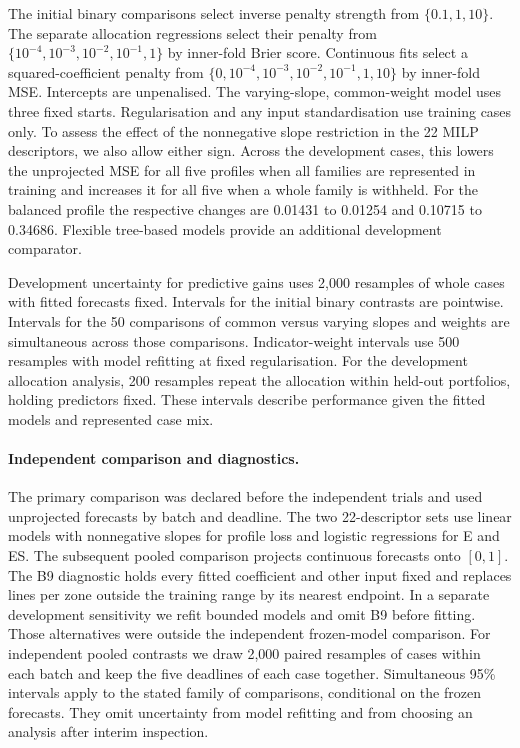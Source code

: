 \documentclass[11pt,a4paper]{article}
\begin{document}
The initial binary comparisons select inverse penalty strength from \(\{0.1,1,10\}\). The separate allocation regressions select their penalty from \(\{10^{-4},10^{-3},10^{-2},10^{-1},1\}\) by inner-fold Brier score. Continuous fits select a squared-coefficient penalty from \(\{0,10^{-4},10^{-3},10^{-2},10^{-1},1,10\}\) by inner-fold MSE. Intercepts are unpenalised. The varying-slope, common-weight model uses three fixed starts. Regularisation and any input standardisation use training cases only. To assess the effect of the nonnegative slope restriction in the 22 MILP descriptors, we also allow either sign. Across the development cases, this lowers the unprojected MSE for all five profiles when all families are represented in training and increases it for all five when a whole family is withheld. For the balanced profile the respective changes are 0.01431 to 0.01254 and 0.10715 to 0.34686. Flexible tree-based models provide an additional development comparator.

Development uncertainty for predictive gains uses 2,000 resamples of whole cases with fitted forecasts fixed. Intervals for the initial binary contrasts are pointwise. Intervals for the 50 comparisons of common versus varying slopes and weights are simultaneous across those comparisons. Indicator-weight intervals use 500 resamples with model refitting at fixed regularisation. For the development allocation analysis, 200 resamples repeat the allocation within held-out portfolios, holding predictors fixed. These intervals describe performance given the fitted models and represented case mix.

\paragraph{Independent comparison and diagnostics.}
The primary comparison was declared before the independent trials and used unprojected forecasts by batch and deadline. The two 22-descriptor sets use linear models with nonnegative slopes for profile loss and logistic regressions for E and ES. The subsequent pooled comparison projects continuous forecasts onto \([0,1]\). The B9 diagnostic holds every fitted coefficient and other input fixed and replaces lines per zone outside the training range by its nearest endpoint. In a separate development sensitivity we refit bounded models and omit B9 before fitting. Those alternatives were outside the independent frozen-model comparison. For independent pooled contrasts we draw 2,000 paired resamples of cases within each batch and keep the five deadlines of each case together. Simultaneous 95\% intervals apply to the stated family of comparisons, conditional on the frozen forecasts. They omit uncertainty from model refitting and from choosing an analysis after interim inspection.
\end{document}
